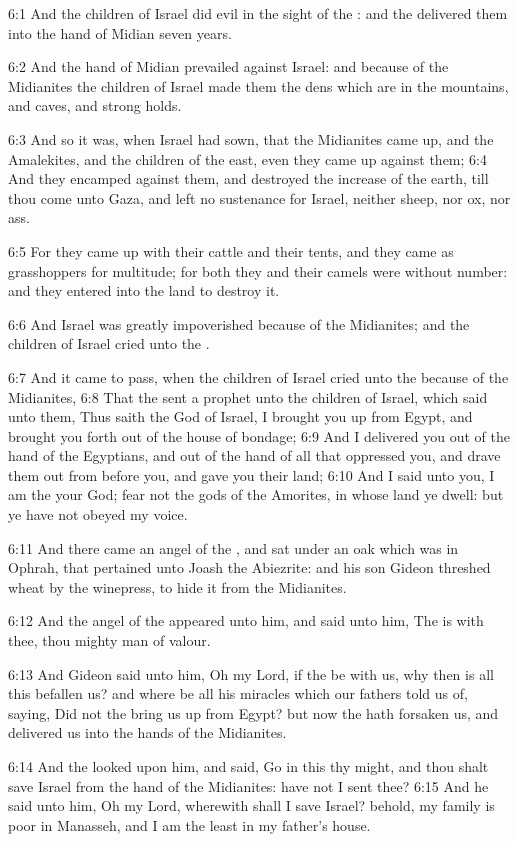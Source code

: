 6:1 And the children of Israel did evil in the sight of the \LORD: and the \LORD delivered them into the hand of Midian seven years.

6:2 And the hand of Midian prevailed against Israel: and because of the Midianites the children of Israel made them the dens which are in the mountains, and caves, and strong holds.

6:3 And so it was, when Israel had sown, that the Midianites came up, and the Amalekites, and the children of the east, even they came up against them; 6:4 And they encamped against them, and destroyed the increase of the earth, till thou come unto Gaza, and left no sustenance for Israel, neither sheep, nor ox, nor ass.

6:5 For they came up with their cattle and their tents, and they came as grasshoppers for multitude; for both they and their camels were without number: and they entered into the land to destroy it.

6:6 And Israel was greatly impoverished because of the Midianites; and the children of Israel cried unto the \LORD.

6:7 And it came to pass, when the children of Israel cried unto the \LORD because of the Midianites, 6:8 That the \LORD sent a prophet unto the children of Israel, which said unto them, Thus saith the \LORD God of Israel, I brought you up from Egypt, and brought you forth out of the house of bondage; 6:9 And I delivered you out of the hand of the Egyptians, and out of the hand of all that oppressed you, and drave them out from before you, and gave you their land; 6:10 And I said unto you, I am the \LORD your God; fear not the gods of the Amorites, in whose land ye dwell: but ye have not obeyed my voice.

6:11 And there came an angel of the \LORD, and sat under an oak which was in Ophrah, that pertained unto Joash the Abiezrite: and his son Gideon threshed wheat by the winepress, to hide it from the Midianites.

6:12 And the angel of the \LORD appeared unto him, and said unto him, The \LORD is with thee, thou mighty man of valour.

6:13 And Gideon said unto him, Oh my Lord, if the \LORD be with us, why then is all this befallen us? and where be all his miracles which our fathers told us of, saying, Did not the \LORD bring us up from Egypt?  but now the \LORD hath forsaken us, and delivered us into the hands of the Midianites.

6:14 And the \LORD looked upon him, and said, Go in this thy might, and thou shalt save Israel from the hand of the Midianites: have not I sent thee?  6:15 And he said unto him, Oh my Lord, wherewith shall I save Israel?  behold, my family is poor in Manasseh, and I am the least in my father's house.

